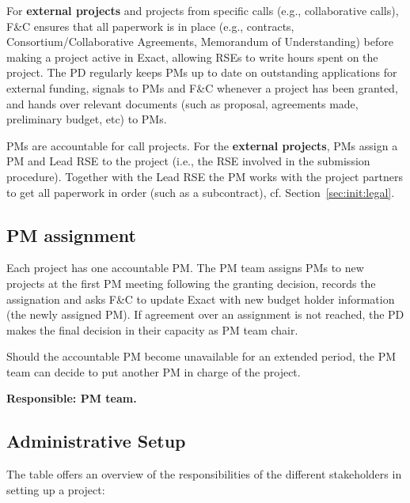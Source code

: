 \documentclass[11pt]{article}
\begin{document}
For \textbf{external projects} and projects from specific calls (e.g., collaborative calls), F\&C ensures that all
paperwork is in place (e.g., contracts, Consortium/Collaborative Agreements, Memorandum of Understanding) before making
a project active in Exact, allowing RSEs to write hours spent on the project. The PD regularly keeps PMs up to date on
outstanding applications for external funding, signals to PMs and F\&C whenever a project has been granted, and hands
over relevant documents (such as proposal, agreements made, preliminary budget, etc) to PMs. 

PMs are accountable for call projects. For the \textbf{external projects}, PMs assign a PM and Lead RSE to the project
(i.e., the RSE involved in the submission procedure). Together with the Lead RSE the PM works with the project partners
to get all paperwork in order (such as a subcontract), cf. Section~\ref{sec:init:legal}. 

\subsection{PM assignment}
Each project has one accountable PM. The PM team assigns PMs to new projects at the first PM meeting following the
granting decision, records the assignation and asks F\&C to update Exact with new budget holder information (the newly
assigned PM). If agreement over an assignment is not reached, the PD makes the final decision in their capacity as PM
team chair.

Should the accountable PM become unavailable for an extended period, the PM team can decide to put another PM in charge
of the project.

\textbf{Responsible: PM team.}

\subsection{Administrative Setup}
The table offers an overview of the responsibilities of the different stakeholders in setting up a project:
\end{document}
